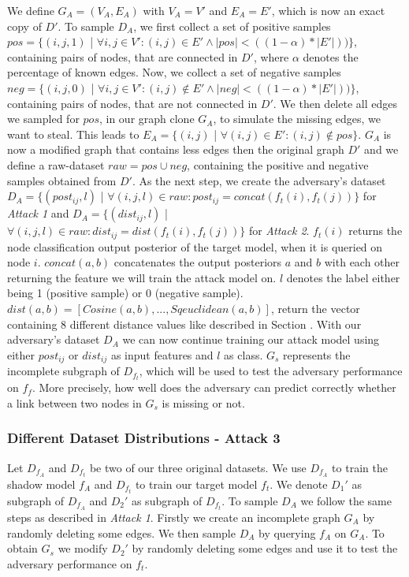         We define $G_A = (V_A, E_A)$ with $V_A = V'$ and $E_A = E'$, which is now an exact copy of $D'$.
        To sample $D_A$, we first collect a set of positive samples $pos = \{(i,j, 1)$ | $\forall i,j \in V': (i,j) \in E' \wedge |pos| < ((1 - \alpha) * |E'|))\}$, containing pairs of nodes, that are connected in $D'$, where $\alpha$ denotes the percentage of known edges.
        Now, we collect a set of negative samples $neg = \{(i,j, 0)$ | $\forall i,j \in V': (i,j) \not\in E' \wedge |neg| < ((1 - \alpha) * |E'|))\}$, containing pairs of nodes, that are not connected in $D'$.
        We then delete all edges we sampled for $pos$, in our graph clone $G_A$, to simulate the missing edges, we want to steal.
        This leads to $E_A = \{(i,j)$ | $\forall (i,j) \in E': (i,j) \not\in pos\}$.
        $G_A$ is now a modified graph that contains less edges then the original graph $D'$ and we define a raw-dataset $raw = pos \cup neg$, containing the positive and negative samples obtained from $D'$.
        As the next step, we create the adversary's dataset $D_A = \{(post_{ij}, l)$ | $\forall (i,j,l)\in raw: post_{ij} = concat(f_t(i), f_t(j))\}$ for \emph{Attack 1} and $D_A = \{(dist_{ij}, l)$ | $\forall (i,j,l)\in raw: dist_{ij} = dist(f_t(i), f_t(j))\}$ for \emph{Attack 2}.
        $f_t(i)$ returns the node classification output posterior of the target model, when it is queried on node $i$.
        $concat(a, b)$ concatenates the output posteriors $a$ and $b$ with each other returning the feature we will train the attack model on.
        $l$ denotes the label either being 1 (positive sample) or 0 (negative sample).
        $dist(a,b) = [Cosine(a,b), ..., Sqeuclidean(a,b)]$, return the vector containing 8 different distance values like described in Section .
        With our adversary's dataset $D_A$ we can now continue training our attack model using either $post_{ij}$ or $dist_{ij}$ as input features and $l$ as class.
        $G_s$ represents the incomplete subgraph of $D_{f_t}$, which will be used to test the adversary performance on $f_f$.
        More precisely, how well does the adversary can predict correctly whether a link between two nodes in $G_s$ is missing or not.

      \subsubsection*{Different Dataset Distributions - Attack 3}

        Let $D_{f_A}$ and $D_{f_t}$ be two of our three original datasets.
        We use $D_{f_A}$ to train the shadow model $f_A$ and $D_{f_t}$ to train our target model $f_t$.
        We denote $D_1'$ as subgraph of $D_{f_A}$ and $D_2'$ as subgraph of $D_{f_t}$.
        To sample $D_A$ we follow the same steps as described in \emph{Attack 1}.
        Firstly we create an incomplete graph $G_A$ by randomly deleting some edges.
        We then sample $D_A$ by querying $f_A$ on $G_A$.
        To obtain $G_s$ we modify $D_2'$ by randomly deleting some edges and use it to test the adversary performance on $f_t$.

